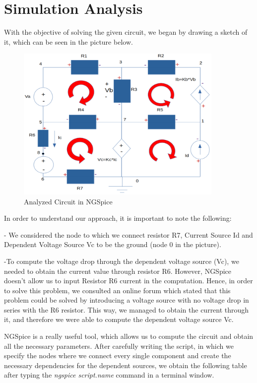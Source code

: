 \documentclass[11en, a4paper, oneside]{article}
\begin{document}
\newpage
\section{Simulation Analysis}
\label{simuanal}
With the objective of solving the given circuit, we began by drawing a sketch of it, which can be seen in the picture below.

\begin{figure}[htb!]
			\begin{center}
				\includegraphics[width=10cm]{Simulacao.png}
				\caption{Analyzed Circuit in NGSpice}
			\end{center}
\end{figure}

In order to understand our approach, it is important to note the following:

- We considered the node to which we connect resistor R7, Current Source Id and Dependent Voltage Source Vc to be the ground (node 0 in the picture).

-To compute the voltage drop through the dependent voltage source (Vc), we needed to obtain the current value through resistor R6. However, NGSpice doesn't allow us to input Resistor R6 current in the computation. Hence, in order to solve this problem, we consulted an online forum which stated that this problem could be solved by introducing a voltage source with no voltage drop in series with the R6 resistor. This way, we managed to obtain the current through it, and therefore we were able to compute the dependent voltage source Vc.

NGSpice is a really useful tool, which allows us to compute the circuit and obtain all the necessary parameters. After carefully writing the script, in which we specify the nodes where we connect every single component and create the necessary dependencies for the dependent sources, we obtain the following table after typing the \textit{ngspice script.name} command in a terminal window.
\end{document}

